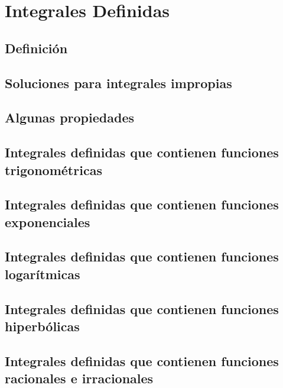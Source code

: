 \chapter{Integrales Definidas}

\section{Definición}

\section{Soluciones para integrales impropias}

\section{Algunas propiedades}

\section{Integrales definidas que contienen funciones trigonométricas}

\section{Integrales definidas que contienen funciones exponenciales}

\section{Integrales definidas que contienen funciones logarítmicas}

\section{Integrales definidas que contienen funciones hiperbólicas}

\section{Integrales definidas que contienen funciones racionales e irracionales}

